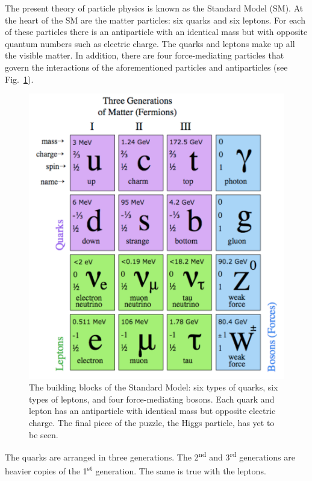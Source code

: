 The present theory of particle physics is known as the Standard Model (SM). At the heart of the SM are the matter particles: six quarks and six leptons. For each of these particles there is an antiparticle with an identical mass but with opposite quantum numbers such as electric charge. The quarks and leptons make up all the visible matter. In addition, there are four force-mediating particles that govern the interactions of the aforementioned particles and antiparticles (see Fig.~\ref{fig_SMparticlesComplete}).

\begin{figure}[htb!]
\centering
\includegraphics[scale=0.5]{SM_particlesComplete.pdf}
\caption[Summary of Standard Model particles and forces.]{The building blocks of the Standard Model: six types of quarks, six types of leptons, and four force-mediating bosons. Each quark and lepton has an antiparticle with identical mass but opposite electric charge. The final piece of the puzzle, the Higgs particle, has yet to be seen.
\label{fig_SMparticlesComplete}}
\end{figure}

The quarks are arranged in three generations. The 2\textsuperscript{nd} and 3\textsuperscript{rd} generations are heavier copies of the 1\textsuperscript{st} generation. The same is true with the leptons.

